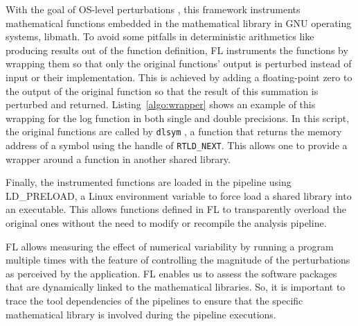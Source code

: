 \documentclass[conference]{IEEEtran}
\begin{document}
With the goal of OS-level perturbations , this framework instruments mathematical functions embedded
in the mathematical library  in GNU operating systems, libmath.
To avoid some pitfalls in deterministic arithmetics like producing results out of the function definition,
FL instruments the functions by wrapping them so that only the original functions' output
is perturbed instead of input or their implementation.
This is achieved by adding a floating-point zero to the output of the original function  so that the result of this summation
is perturbed and returned.
Listing~\ref{algo:wrapper} shows an example of this wrapping for the log function in both single and double precisions.
In this script, the original functions are called by \texttt{dlsym} , a function that returns the memory address of a symbol
using the handle of \texttt{RTLD\_NEXT}.
This allows one to provide a wrapper around a function in another shared library. 



%


Finally, the instrumented functions are loaded in the pipeline using LD\_PRELOAD, a Linux environment variable
to force load a shared library into an executable.
This allows functions defined in FL to transparently
overload the original ones without the need to modify or recompile the analysis pipeline.

FL allows measuring the effect of numerical variability by running a program multiple times
with the feature of controlling the magnitude of the perturbations as perceived by the application.
FL enables us to assess the software packages that are dynamically linked to the mathematical libraries.
So, it is important to trace the tool dependencies of the pipelines to ensure that the specific mathematical library
is involved during the pipeline executions. 
\end{document}

